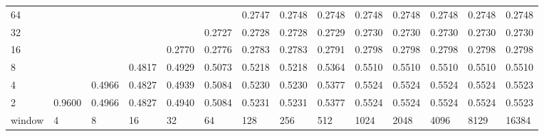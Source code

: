 \begin{table}[h!]
{\begin{tabular}{lrrrrrrrrrrrrr}
			\multicolumn{1}{|l|}{64} &  &  &  &  &  & \cellcolor[HTML]{99E600}0.2747 & \cellcolor[HTML]{99E600}0.2748 & \cellcolor[HTML]{99E600}0.2748 & \cellcolor[HTML]{99E600}0.2748 & \cellcolor[HTML]{99E600}0.2748 & \cellcolor[HTML]{99E600}0.2748 & \cellcolor[HTML]{99E600}0.2748 & \cellcolor[HTML]{99E600}0.2748 \\ \cline{1-1}
			\multicolumn{1}{|l|}{32} &  &  &  &  & \cellcolor[HTML]{99E600}0.2727 & \cellcolor[HTML]{99E600}0.2728 & \cellcolor[HTML]{99E600}0.2728 & \cellcolor[HTML]{99E600}0.2729 & \cellcolor[HTML]{99E600}0.2730 & \cellcolor[HTML]{99E600}0.2730 & \cellcolor[HTML]{99E600}0.2730 & \cellcolor[HTML]{99E600}0.2730 & \cellcolor[HTML]{99E600}0.2730 \\ \cline{1-1}
			\multicolumn{1}{|l|}{16} &  &  &  & \cellcolor[HTML]{99E600}0.2770 & \cellcolor[HTML]{99E600}0.2776 & \cellcolor[HTML]{99E600}0.2783 & \cellcolor[HTML]{99E600}0.2783 & \cellcolor[HTML]{99E600}0.2791 & \cellcolor[HTML]{99E600}0.2798 & \cellcolor[HTML]{99E600}0.2798 & \cellcolor[HTML]{99E600}0.2798 & \cellcolor[HTML]{99E600}0.2798 & \cellcolor[HTML]{99E600}0.2798 \\ \cline{1-1}
			\multicolumn{1}{|l|}{8} &  &  & \cellcolor[HTML]{E69900}0.4817 & \cellcolor[HTML]{E69900}0.4929 & \cellcolor[HTML]{E69900}0.5073 & \cellcolor[HTML]{E69900}0.5218 & \cellcolor[HTML]{E69900}0.5218 & \cellcolor[HTML]{E69900}0.5364 & \cellcolor[HTML]{E60000}0.5510 & \cellcolor[HTML]{E60000}0.5510 & \cellcolor[HTML]{E60000}0.5510 & \cellcolor[HTML]{E60000}0.5510 & \cellcolor[HTML]{E60000}0.5510 \\ \cline{1-1}
			\multicolumn{1}{|l|}{4} &  & \cellcolor[HTML]{E69900}0.4966 & \cellcolor[HTML]{E69900}0.4827 & \cellcolor[HTML]{E69900}0.4939 & \cellcolor[HTML]{E69900}0.5084 & \cellcolor[HTML]{E69900}0.5230 & \cellcolor[HTML]{E69900}0.5230 & \cellcolor[HTML]{E69900}0.5377 & \cellcolor[HTML]{E60000}0.5524 & \cellcolor[HTML]{E60000}0.5524 & \cellcolor[HTML]{E60000}0.5524 & \cellcolor[HTML]{E60000}0.5524 & \cellcolor[HTML]{E60000}0.5523 \\ \cline{1-1}
			\multicolumn{1}{|l|}{2} & \cellcolor[HTML]{4C00E6}0.9600 & \cellcolor[HTML]{E69900}0.4966 & \cellcolor[HTML]{E69900}0.4827 & \cellcolor[HTML]{E69900}0.4940 & \cellcolor[HTML]{E69900}0.5084 & \cellcolor[HTML]{E69900}0.5231 & \cellcolor[HTML]{E69900}0.5231 & \cellcolor[HTML]{E69900}0.5377 & \cellcolor[HTML]{E60000}0.5524 & \cellcolor[HTML]{E60000}0.5524 & \cellcolor[HTML]{E60000}0.5524 & \cellcolor[HTML]{E60000}0.5524 & \cellcolor[HTML]{E60000}0.5523 \\ \hline
			\multicolumn{1}{l|}{window} & \multicolumn{1}{l|}{4} & \multicolumn{1}{l|}{8} & \multicolumn{1}{l|}{16} & \multicolumn{1}{l|}{32} & \multicolumn{1}{l|}{64} & \multicolumn{1}{l|}{128} & \multicolumn{1}{l|}{256} & \multicolumn{1}{l|}{512} & \multicolumn{1}{l|}{1024} & \multicolumn{1}{l|}{2048} & \multicolumn{1}{l|}{4096} & \multicolumn{1}{l|}{8129} & \multicolumn{1}{l|}{16384} \\ \cline{2-14} 
		\end{tabular}
	}
\end{table}


